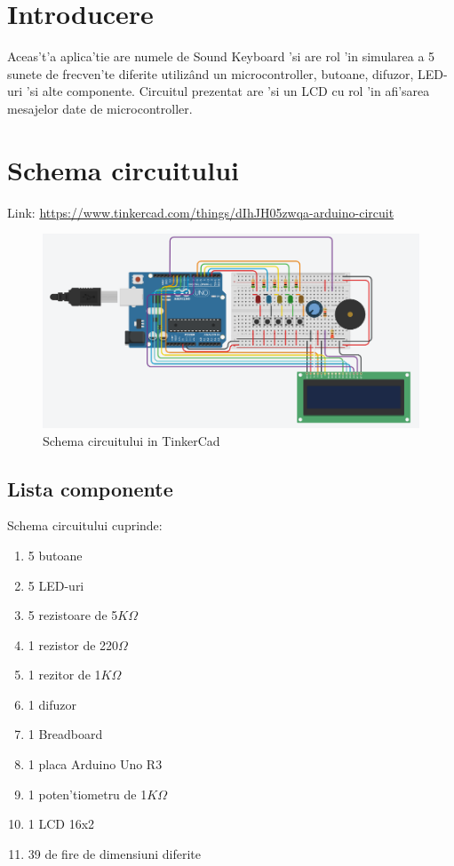 \section{Introducere}
\myindent
Aceas't'a aplica'tie are numele de Sound Keyboard 'si are rol 'in simularea a 5 sunete de frecven'te diferite utiliz\^and un microcontroller, butoane, difuzor, LED-uri 'si alte componente. Circuitul prezentat are 'si un LCD cu rol 'in afi'sarea mesajelor date de microcontroller.

\vspace{10 mm}
\section{Schema circuitului}

Link: \url{https://www.tinkercad.com/things/dIhJH05zwqa-arduino-circuit}

\vspace{10mm}
\begin{figure}[ht]
\centering
\includegraphics[scale=0.65]{Fisiere/Sound keyboard}
\caption {Schema circuitului in TinkerCad}
\end{figure}
\FloatBarrier

\newpage
\subsection{Lista componente}
Schema circuitului cuprinde: 
\begin{enumerate}
\color{ForestGreen}
\item 5 butoane
\item 5 LED-uri
\item 5 rezistoare de 5$K\Omega$
\item 1 rezistor de 220$\Omega$
\item 1 rezitor de 1$K\Omega$
\item 1 difuzor
\item 1 Breadboard
\item 1 placa Arduino Uno R3
\item 1 poten'tiometru de 1$K\Omega$
\item 1 LCD 16x2
\item 39 de fire de dimensiuni diferite
\end{enumerate}

